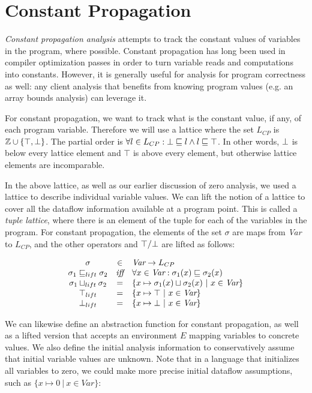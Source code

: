 \documentclass[11pt]{article}
\begin{document}
\section{Constant Propagation}

\emph{Constant propagation analysis} attempts to track the constant values of
variables in the program, where possible. Constant propagation has long been
used in compiler optimization passes in order to turn variable reads and
computations into constants. However, it is generally useful for analysis for
program correctness as well: any client analysis that benefits from knowing
program values (e.g. an array bounds analysis) can leverage it.

For constant propagation, we want to track what is the constant value, if any,
of each program variable. Therefore we will use a lattice where the set $L_{CP}$
is $\mathbb{Z} \cup \{ \top, \bot \}$. The partial order is
$\forall l \in L_{CP}: \bot \sqsubseteq l \land l \sqsubseteq \top$. In other words,
$\bot$ is below every lattice element and $\top$ is above every element, but
otherwise lattice elements are incomparable.

In the above lattice, as well as our earlier discussion of zero analysis, we used a lattice to describe individual variable values.  We can lift the notion of a lattice to cover all the dataflow information available at a program point.  This is called a \textit{tuple lattice}, where there is an element of the tuple for each of the variables in the program.  For constant propagation, the elements of the set $\sigma$ are maps from \textit{Var} to $L_{CP}$, and the other operators and $\top/\bot$ are lifted as follows:

\[
\begin{array}{ccl}

\sigma & \in & \textit{Var} \rightarrow L_{CP}\\
\sigma_1 \sqsubseteq_{lift} \sigma_2 & \textit{iff} & \forall x \in \textit{Var} : \sigma_1(x) \sqsubseteq \sigma_2(x)\\
\sigma_1 \sqcup_{lift} \sigma_2 & = & \{ x \mapsto \sigma_1(x) \sqcup \sigma_2(x) ~|~ x \in \textit{Var} \}\\
\top_{lift} & = & \{ x \mapsto \top ~|~ x \in \textit{Var} \}\\
\bot_{lift} & = & \{ x \mapsto \bot ~|~ x \in \textit{Var} \}\\

\end{array}
\]

We can likewise define an abstraction function for constant propagation, as well as a lifted version that accepts an environment $E$ mapping variables to concrete values.  We also define the initial analysis information to conservatively assume that initial variable values are unknown.  Note that in a language that initializes all variables to zero, we could make more precise initial dataflow assumptions, such as $\{ x \mapsto 0 ~|~ x \in \textit{Var} \}$:
\end{document}
